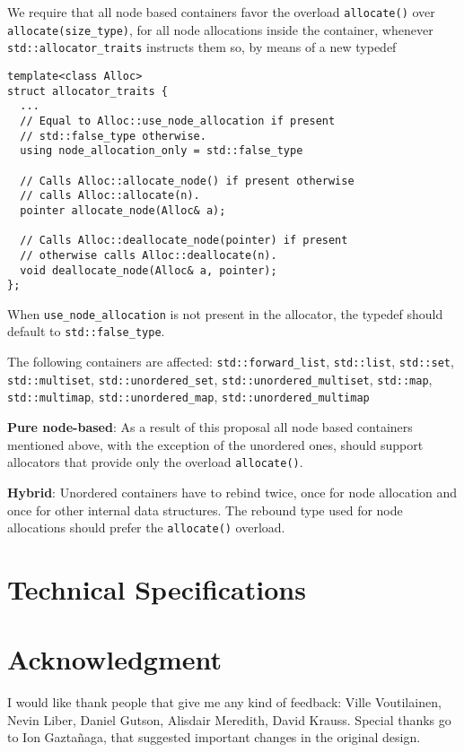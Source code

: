 \documentclass[11pt]{article}
\begin{document}
We require that all node based containers favor the overload
\texttt{allocate()} over \texttt{allocate(size\_type)}, for all node
allocations inside the container, whenever
\texttt{std::allocator\_traits} instructs them so, by means of a new
typedef
\medskip
\begin{lstlisting}
template<class Alloc>
struct allocator_traits {
  ...
  // Equal to Alloc::use_node_allocation if present
  // std::false_type otherwise.
  using node_allocation_only = std::false_type

  // Calls Alloc::allocate_node() if present otherwise
  // calls Alloc::allocate(n).
  pointer allocate_node(Alloc& a);

  // Calls Alloc::deallocate_node(pointer) if present
  // otherwise calls Alloc::deallocate(n).
  void deallocate_node(Alloc& a, pointer);
};
\end{lstlisting}
When \texttt{use\_node\_allocation} is not present in the allocator,
the typedef should default to \texttt{std::false\_type}.

The following containers are affected: \texttt{std::forward\_list},
\texttt{std::list}, \texttt{std::set}, \texttt{std::multiset},
\texttt{std::unordered\_set}, \texttt{std::unordered\_multiset},
\texttt{std::map}, \texttt{std::multimap},
\texttt{std::unordered\_map}, \texttt{std::unordered\_multimap}

\medskip
\noindent
{\bf Pure node-based}: As a result of this proposal all node based
containers mentioned above, with the exception of the unordered ones,
should support allocators that provide only the overload
\texttt{allocate()}.

\medskip
\noindent
{\bf Hybrid}: Unordered containers have to rebind twice, once
for node allocation and once for other internal data structures.
The rebound type used for node allocations should prefer the 
\texttt{allocate()} overload.

\section{Technical Specifications}

\section{Acknowledgment}

I would like thank people that give me any kind of feedback: Ville Voutilainen,
Nevin Liber, Daniel Gutson, Alisdair Meredith, David Krauss. Special thanks go
to Ion Gaztañaga, that suggested important changes in the original design.
\end{document}
